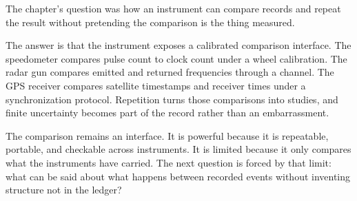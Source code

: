 \begin{bridge}

The chapter's question was how an instrument can compare records and repeat the
result without pretending the comparison is the thing measured.

The answer is that the instrument exposes a calibrated comparison interface.
The speedometer compares pulse count to clock count under a wheel calibration.
The radar gun compares emitted and returned frequencies through a channel. The
GPS receiver compares satellite timestamps and receiver times under a
synchronization protocol. Repetition turns those comparisons into studies, and
finite uncertainty becomes part of the record rather than an embarrassment.

The comparison remains an interface. It is powerful because it is repeatable,
portable, and checkable across instruments. It is limited because it only
compares what the instruments have carried. The next question is forced by that
limit: what can be said about what happens between recorded events without
inventing structure not in the ledger?

\end{bridge}

